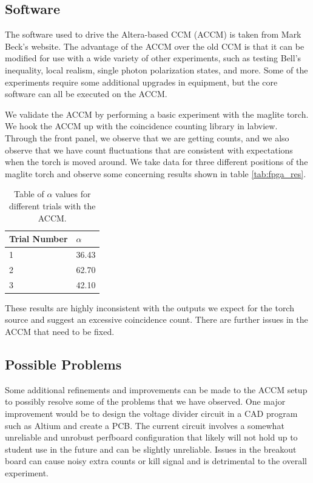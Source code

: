 \documentclass[letterpaper, 11 pt]{article}
\begin{document}
\subsection{Software}

The software used to drive the Altera-based CCM (ACCM) is taken from Mark Beck's
website. The advantage of the ACCM over the old CCM is that it can be modified for use
with a wide variety of other experiments, such as testing Bell's inequality, local realism, single
photon polarization states, and more. Some of the experiments require some additional upgrades
in equipment, but the core software can all be executed on the ACCM.

We validate the ACCM by performing a basic experiment with the maglite torch.
We hook the ACCM up with the coincidence counting library in labview. Through the front panel,
we observe that we are getting counts, and we also observe that we have count fluctuations that
are consistent with expectations when the torch is moved around. We take data for three different positions
of the maglite torch and observe some concerning results shown in table \ref{tab:fpga_res}.
\begin{table}[H]
    \centering
    \begin{tabular}{|l|l|}
    \hline
    \textbf{Trial Number} & \textbf{$\alpha$} \\ \hline
    1   & 36.43                  \\ \hline
    2        & 62.70                   \\ \hline
    3        & 42.10                   \\ \hline
    \end{tabular}
    \caption{Table of $\alpha$ values for different trials with the ACCM.}
\end{table}\label{tab:fpga_res}
These results are highly inconsistent with the outputs we expect for the torch source
and suggest an excessive coincidence count. There are further issues in the ACCM that need to be fixed.

\subsection{Possible Problems}

Some additional refinements and improvements can be made to the ACCM setup to possibly
resolve some of the problems that we have observed. One major improvement would be to
design the voltage divider circuit in a CAD program such as Altium and create a PCB.
The current circuit involves a somewhat unreliable and unrobust perfboard configuration that
likely will not hold up to student use in the future and can be slightly unreliable. Issues in the
breakout board can cause noisy extra counts or kill signal and is detrimental to the overall experiment.
\end{document}
